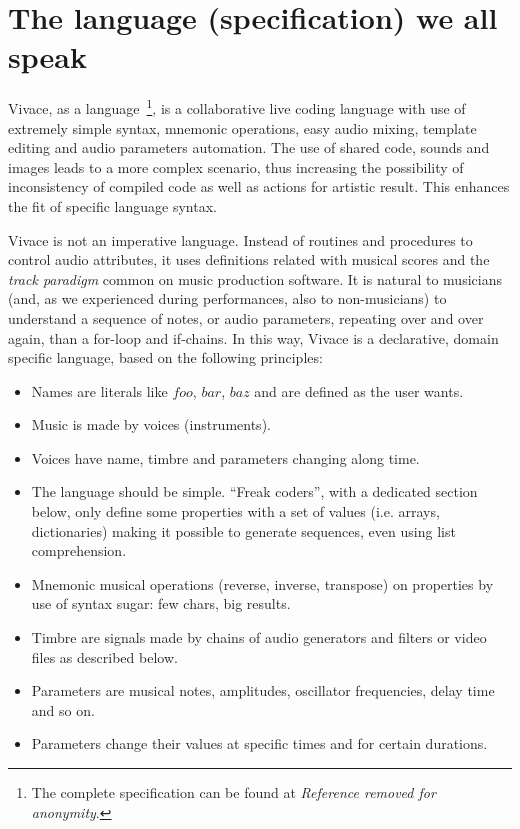 \documentclass[letterpaper, 12pt]{article}
\begin{document}
\section{The language (specification) we all speak}

Vivace, as a language~\footnote{The complete specification can be
  found at
  \textit{Reference removed for anonymity}.}, is a
collaborative live coding language with use of extremely simple
syntax, mnemonic operations, easy audio mixing, template editing and
audio parameters automation. The use of shared code, sounds and images
leads to a more complex scenario, thus increasing the possibility of
inconsistency of compiled code as well as actions for artistic
result. This enhances the fit of specific language syntax.

Vivace is not an imperative language. Instead of routines and
procedures to control audio attributes, it uses definitions related
with musical scores and the \emph{track paradigm} common on music
production software. It is natural to musicians (and, as we
experienced during performances, also to non-musicians) to understand
a sequence of notes, or audio parameters, repeating over and over
again, than a for-loop and if-chains. In this way, Vivace is a
declarative, domain specific language, based on the following
principles:

\begin{itemize}
  
\item Names are literals like $foo$, $bar$, $baz$ and are defined as
  the user wants.
\item Music is made by voices (instruments).
\item Voices have name, timbre and parameters changing along time.
\item The language should be simple. ``Freak coders'', with a
  dedicated section below, only define some properties with a set of
  values (i.e. arrays, dictionaries) making it possible to generate
  sequences, even using list comprehension.
\item Mnemonic musical operations (reverse, inverse, transpose) on
  properties by use of syntax sugar: few chars, big results.
\item Timbre are signals made by chains of audio generators and
  filters or video files as described below.
\item Parameters are musical notes, amplitudes, oscillator
  frequencies, delay time and so on.
\item Parameters change their values at specific times and for certain
  durations.
\end{itemize}
\end{document}
